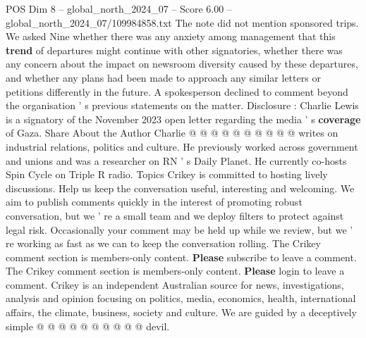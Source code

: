 \begin{textsample}{POS Dim 8 – global\_north\_2024\_07 – Score 6.00 – global\_north\_2024\_07/109984858.txt}
The note did not mention sponsored trips.
We asked Nine whether there was any anxiety among management that this \textbf{trend} of departures might continue with other signatories, whether there was any concern about the impact on newsroom diversity caused by these departures, and whether any plans had been made to approach any similar letters or petitions differently in the future.
A spokesperson declined to comment beyond the organisation ' s previous statements on the matter.
Disclosure : Charlie Lewis is a signatory of the November 2023 open letter regarding the media ' s \textbf{coverage} of Gaza.
Share About the Author Charlie @ @ @ @ @ @ @ @ @ @ writes on industrial relations, politics and culture.
He previously worked across government and unions and was a researcher on RN ' s Daily Planet.
He currently co-hosts Spin Cycle on Triple R radio.
Topics Crikey is committed to hosting lively discussions.
Help us keep the conversation useful, interesting and welcoming.
We aim to publish comments quickly in the interest of promoting robust conversation, but we ' re a small team and we deploy filters to protect against legal risk.
Occasionally your comment may be held up while we review, but we ' re working as fast as we can to keep the conversation rolling.
The Crikey comment section is members-only content. \textbf{Please} subscribe to leave a comment.
The Crikey comment section is members-only content. \textbf{Please} login to leave a comment.
Crikey is an independent Australian source for news, investigations, analysis and opinion focusing on politics, media, economics, health, international affairs, the climate, business, society and culture.
We are guided by a deceptively simple @ @ @ @ @ @ @ @ @ @ devil.

\end{textsample}
